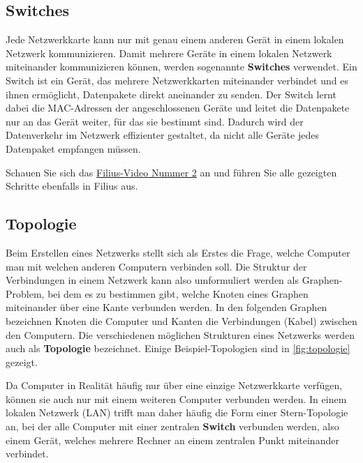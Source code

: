 \subsection{Switches}
Jede Netzwerkkarte kann nur mit genau einem anderen Gerät in einem lokalen Netzwerk kommunizieren. Damit mehrere Geräte in einem lokalen Netzwerk miteinander kommunizieren können, werden sogenannte \textbf{Switches} verwendet. Ein Switch ist ein Gerät, das mehrere Netzwerkkarten miteinander verbindet und es ihnen ermöglicht, Datenpakete direkt aneinander zu senden. Der Switch lernt dabei die \gls{MAC}-Adressen der angeschlossenen Geräte und leitet die Datenpakete nur an das Gerät weiter, für das sie bestimmt sind. Dadurch wird der Datenverkehr im Netzwerk effizienter gestaltet, da nicht alle Geräte jedes Datenpaket empfangen müssen.

\begin{myexercise}
	Schauen Sie sich das \href{https://www.youtube.com/watch?v=Kn8v_HrckUM&list=PLUfZiVdJui-57k0VcRecHX0JTEhOMgiKP}{Filius-Video Nummer 2} an und führen Sie alle gezeigten Schritte ebenfalls in Filius aus.
\end{myexercise}

\subsection{Topologie}
Beim Erstellen eines Netzwerks stellt sich als Erstes die Frage, welche Computer man mit welchen anderen Computern verbinden soll. Die Struktur der Verbindungen in einem Netzwerk kann also umformuliert werden als Graphen-Problem, bei dem es zu bestimmen gibt, welche Knoten eines Graphen miteinander über eine Kante verbunden werden. In den folgenden Graphen bezeichnen Knoten die Computer und Kanten die Verbindungen (Kabel) zwischen den Computern. Die verschiedenen möglichen Strukturen eines Netzwerks werden auch als \textbf{Topologie} bezeichnet. Einige Beispiel-Topologien sind in \cref{fig:topologie} gezeigt.


Da Computer in Realität häufig nur über eine einzige Netzwerkkarte verfügen, können sie auch nur mit einem weiteren Computer verbunden werden. In einem lokalen Netzwerk (\gls{LAN}) trifft man daher häufig die Form einer Stern-Topologie an, bei der alle Computer mit einer zentralen \textbf{Switch} verbunden werden, also einem Gerät, welches mehrere Rechner an einem zentralen Punkt miteinander verbindet.


